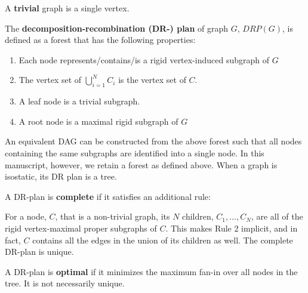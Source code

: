 
A \textbf{trivial} graph is   a single vertex.
\begin{definition}\label{def:drp}
    The \textbf{decomposition-recombination \mbox{(DR-)} plan} of graph $G$,
    \cite{XX}
    $DRP(G)$, is defined as a forest that has the following properties:
    \begin{enumerate}
        \item Each  node represents/contains/is  a rigid vertex-induced subgraph of $G$
        \item The vertex set of $\bigcup_{i=1}^N{C_i}$ is the 
            vertex set of $C$.
        \item A leaf node is a trivial subgraph.
       \item A root node is a maximal rigid subgraph of $G$
    \end{enumerate}


    An equivalent DAG can be constructed from the above forest such that all nodes
    containing the same subgraphs are identified into a single node.
    In this manuscript, however, we retain a forest as defined above.
    When a graph is isostatic, its DR plan is a tree.


    A DR-plan is \textbf{complete} if it satisfies an additional rule: 
        \item For a node, $C$, that is  a non-trivial graph, its $N$
            children, $C_1, \ldots, C_N$, are all of the 
            rigid vertex-maximal proper subgraphs of $C$.
    This makes Rule 2 implicit, and in fact, $C$ contains all the edges in
    the union of its children as well. The complete DR-plan is unique.

    A DR-plan is \textbf{optimal} if it minimizes the maximum fan-in over all nodes in the tree. It is not necessarily unique.
\end{definition}

